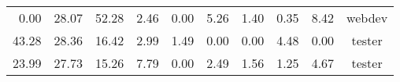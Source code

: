 \begin{table}[]
\begin{tabular}{@{}rrrrrrrrrc@{}}
      0.00                                                                            & 28.07                                                                                  & 52.28                                                                          & 2.46                                                                                     & 0.00                                                                                     & 5.26                                                                            & 1.40                                                                                     & 0.35                                                                           & 8.42                                                                             & webdev                                                        \\
      43.28                                                                           & 28.36                                                                                  & 16.42                                                                          & 2.99                                                                                     & 1.49                                                                                     & 0.00                                                                            & 0.00                                                                                     & 4.48                                                                           & 0.00                                                                             & tester                                                        \\
      23.99                                                                           & 27.73                                                                                  & 15.26                                                                          & 7.79                                                                                     & 0.00                                                                                     & 2.49                                                                            & 1.56                                                                                     & 1.25                                                                           & 4.67                                                                             & tester                                                        \\

\end{tabular}
\end{table}
